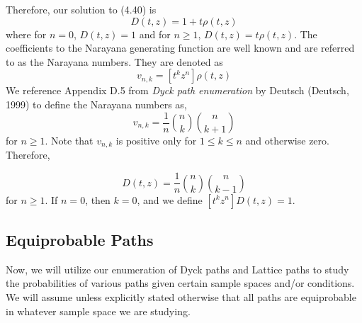 \documentclass[12pt]{article}
\theoremstyle{definition}
\numberwithin{equation}{section}
\begin{document}
Therefore, our solution to (4.40) is 
\begin{equation}
    D(t,z) = 1 + t\rho(t,z)
\end{equation}
where for $n=0$, $D(t,z) = 1$ and for $n\geq 1$, $D(t,z) = t\rho(t,z)$. The coefficients to the Narayana generating function are well known and are referred to as the Narayana numbers. They are denoted as
\begin{equation}
    v_{n,k} = [t^kz^n]\rho(t,z)
\end{equation}
We reference Appendix D.5 from \emph{Dyck path enumeration} by Deutsch (Deutsch, 1999) to define the Narayana numbers as,
\begin{equation}
    v_{n,k} = \frac{1}{n}\binom{n}{k}\binom{n}{k + 1}
\end{equation}
for $n\geq 1$. Note that $v_{n,k}$ is positive only for $1\leq k\leq n$ and otherwise zero. Therefore,
\iffalse
\begin{equation}
    [t^kz^n]D(t,z) = t[t^kz^n]\rho(t,z) = [t^{k+1}z^n]\rho(t,z) = \frac{1}{n}\binom{n}{k+1}\binom{n}{k+2}
\end{equation}
and therefore,
\fi
\begin{equation}
    [t^kz^n]D(t,z) =\frac{1}{n}\binom{n}{k}\binom{n}{k-1}
\end{equation}
for $n\geq 1$. If $n=0$, then $k=0$, and we define $[t^kz^n]D(t,z) = 1$.

\subsection{Equiprobable Paths}
Now, we will utilize our enumeration of Dyck paths and Lattice paths to study the probabilities of various paths given certain sample spaces and/or conditions. We will assume unless explicitly stated otherwise that all paths are equiprobable in whatever sample space we are studying.
\end{document}
